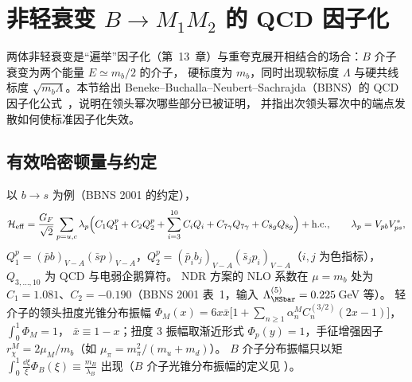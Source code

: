 
\section{非轻衰变 \texorpdfstring{$B\to M_1M_2$}{B -> M1 M2} 的 QCD 因子化}\label{sec:qcdf}

两体非轻衰变是“遍举”因子化（第~13~章）与重夸克展开相结合的场合：$B$ 介子衰变为两个能量 $E\simeq m_b/2$ 的介子，
硬标度为 $m_b$，同时出现软标度 $\Lambda$ 与硬共线标度 $\sqrt{m_b\Lambda}$。本节给出 Beneke--Buchalla--Neubert--Sachrajda（BBNS）的
QCD 因子化公式~\cite{BenekeEtAl1999,BenekeEtAl2000,BenekeEtAl2001,BenekeNeubert2003}，说明在领头幂次哪些部分已被证明，
并指出次领头幂次中的端点发散如何使标准因子化失效。

\subsection{有效哈密顿量与约定}
以 $b\to s$ 为例（BBNS 2001 的约定），
\begin{equation}\label{eq:qcdf-Heff}
\mathcal H_{\rm eff}=\frac{G_F}{\sqrt2}\sum_{p=u,c}\lambda_p\Big(C_1Q_1^p+C_2Q_2^p+\sum_{i=3}^{10}C_iQ_i+C_{7\gamma}Q_{7\gamma}+C_{8g}Q_{8g}\Big)+\text{h.c.},
\qquad \lambda_p=V_{pb}V_{ps}^*,
\end{equation}
$Q_1^p=(\bar pb)_{V-A}(\bar sp)_{V-A}$，$Q_2^p=(\bar p_ib_j)_{V-A}(\bar s_jp_i)_{V-A}$（$i,j$ 为色指标），$Q_{3,\dots,10}$ 为 QCD 与电弱企鹅算符。
NDR 方案的 NLO 系数在 $\mu=m_b$ 处为 $C_1=1.081$、$C_2=-0.190$（BBNS 2001 表~1，输入 $\Lambda^{(5)}_{\MSbar}=0.225$\,GeV 等）。
轻介子的领头扭度光锥分布振幅 $\Phi_M(x)=6x\bar x\big[1+\sum_{n\geq1}\alpha_n^MC_n^{(3/2)}(2x-1)\big]$，$\int_0^1\Phi_M=1$，
$\bar x\equiv1-x$；扭度 3 振幅取渐近形式 $\Phi_p(y)=1$，手征增强因子 $r_\chi^M=2\mu_M/m_b$（如 $\mu_\pi=m_\pi^2/(m_u+m_d)$）。
$B$ 介子分布振幅只以矩 $\int_0^1\frac{\dd\xi}{\xi}\Phi_B(\xi)\equiv\frac{m_B}{\lambda_B}$ 出现（$B$ 介子光锥分布振幅的定义见 \cite{GrozinNeubert1997}）。

